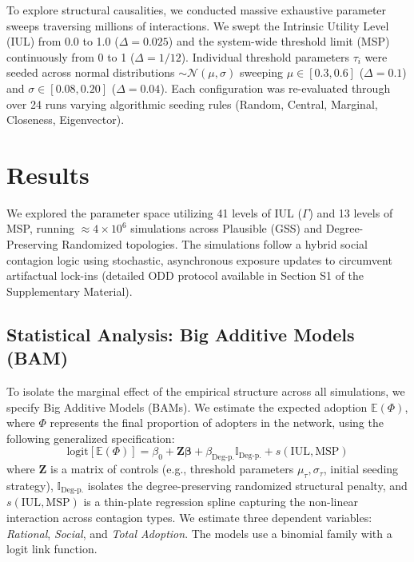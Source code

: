 \documentclass[5p,twocolumn,authoryear]{elsarticle}
\begin{document}
To explore structural causalities, we conducted massive exhaustive parameter sweeps traversing millions of interactions. We swept the Intrinsic Utility Level (IUL) from 0.0 to 1.0 ($\Delta = 0.025$) and the system-wide threshold limit (MSP) continuously from 0 to 1 ($\Delta = 1/12$). Individual threshold parameters $\tau_i$ were seeded across normal distributions $\sim \mathcal{N}(\mu, \sigma)$ sweeping $\mu \in [0.3, 0.6]$ ($\Delta = 0.1$) and $\sigma \in [0.08, 0.20]$ ($\Delta = 0.04$). Each configuration was re-evaluated through over 24 runs varying algorithmic seeding rules (Random, Central, Marginal, Closeness, Eigenvector).

\section{Results}

We explored the parameter space utilizing 41 levels of IUL ($\Gamma$) and 13 levels of MSP, running $\approx 4 \times 10^6$ simulations across Plausible (GSS) and Degree-Preserving Randomized topologies. The simulations follow a hybrid social contagion logic using stochastic, asynchronous exposure updates to circumvent artifactual lock-ins (detailed ODD protocol available in Section S1 of the Supplementary Material).

\subsection{Statistical Analysis: Big Additive Models (BAM)}
To isolate the marginal effect of the empirical structure across all simulations, we specify Big Additive Models (BAMs). We estimate the expected adoption $\mathbb{E}(\Phi)$, where $\Phi$ represents the final proportion of adopters in the network, using the following generalized specification:
\begin{equation}
    \text{logit}[\mathbb{E}(\Phi)] = \beta_0 + \mathbf{Z}\boldsymbol{\beta} + \beta_{\text{Deg-p.}} \mathbb{I}_{\text{Deg-p.}} + s(\text{IUL}, \text{MSP})
\end{equation}
where $\mathbf{Z}$ is a matrix of controls (e.g., threshold parameters $\mu_\tau, \sigma_\tau$, initial seeding strategy), $\mathbb{I}_{\text{Deg-p.}}$ isolates the degree-preserving randomized structural penalty, and $s(\text{IUL}, \text{MSP})$ is a thin-plate regression spline capturing the non-linear interaction across contagion types. We estimate three dependent variables: \textit{Rational}, \textit{Social}, and \textit{Total Adoption}. The models use a binomial family with a logit link function.
\end{document}
